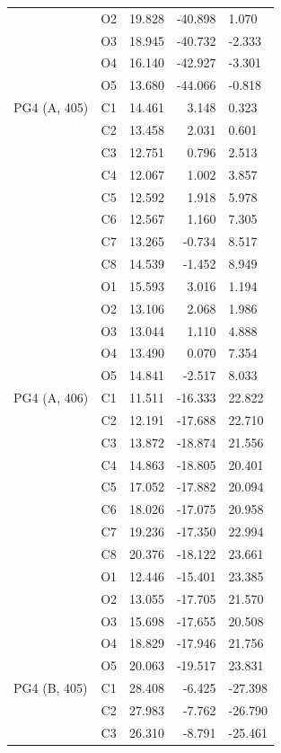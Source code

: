 \begin{longtable}{@{}lcrr@{}}
   & O2 & 19.828 & -40.898 & 1.070 \\
   & O3 & 18.945 & -40.732 & -2.333 \\
   & O4 & 16.140 & -42.927 & -3.301 \\
   & O5 & 13.680 & -44.066 & -0.818 \\
  \cmidrule(r){1-5}
  PG4 (A, 405) & C1 & 14.461 & 3.148 & 0.323 \\
   & C2 & 13.458 & 2.031 & 0.601 \\
   & C3 & 12.751 & 0.796 & 2.513 \\
   & C4 & 12.067 & 1.002 & 3.857 \\
   & C5 & 12.592 & 1.918 & 5.978 \\
   & C6 & 12.567 & 1.160 & 7.305 \\
   & C7 & 13.265 & -0.734 & 8.517 \\
   & C8 & 14.539 & -1.452 & 8.949 \\
   & O1 & 15.593 & 3.016 & 1.194 \\
   & O2 & 13.106 & 2.068 & 1.986 \\
   & O3 & 13.044 & 1.110 & 4.888 \\
   & O4 & 13.490 & 0.070 & 7.354 \\
   & O5 & 14.841 & -2.517 & 8.033 \\
  \cmidrule(r){1-5}
  PG4 (A, 406) & C1 & 11.511 & -16.333 & 22.822 \\
   & C2 & 12.191 & -17.688 & 22.710 \\
   & C3 & 13.872 & -18.874 & 21.556 \\
   & C4 & 14.863 & -18.805 & 20.401 \\
   & C5 & 17.052 & -17.882 & 20.094 \\
   & C6 & 18.026 & -17.075 & 20.958 \\
   & C7 & 19.236 & -17.350 & 22.994 \\
   & C8 & 20.376 & -18.122 & 23.661 \\
   & O1 & 12.446 & -15.401 & 23.385 \\
   & O2 & 13.055 & -17.705 & 21.570 \\
   & O3 & 15.698 & -17.655 & 20.508 \\
   & O4 & 18.829 & -17.946 & 21.756 \\
   & O5 & 20.063 & -19.517 & 23.831 \\
  \cmidrule(r){1-5}
  PG4 (B, 405) & C1 & 28.408 & -6.425 & -27.398 \\
   & C2 & 27.983 & -7.762 & -26.790 \\
   & C3 & 26.310 & -8.791 & -25.461 \\

\end{longtable}
